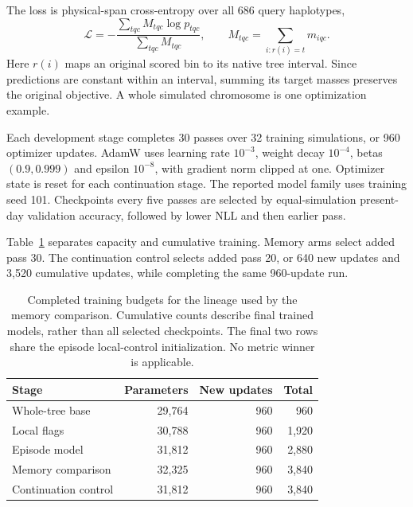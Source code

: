 \documentclass[letterpaper]{article}
\begin{document}
The loss is physical-span cross-entropy over all 686 query haplotypes,
\begin{equation}
\mathcal L=-\frac{\sum_{tqc} M_{tqc}\log p_{tqc}}
                  {\sum_{tqc} M_{tqc}},
\qquad
M_{tqc}=\sum_{i:r(i)=t}m_{iqc}.
\end{equation}
Here $r(i)$ maps an original scored bin to its native tree interval. Since predictions are constant within an interval, summing its target masses preserves the original objective. A whole simulated chromosome is one optimization example.

Each development stage completes 30 passes over 32 training simulations, or 960 optimizer updates. AdamW uses learning rate $10^{-3}$, weight decay $10^{-4}$, betas $(0.9,0.999)$ and epsilon $10^{-8}$, with gradient norm clipped at one. Optimizer state is reset for each continuation stage. The reported model family uses training seed 101. Checkpoints every five passes are selected by equal-simulation present-day validation accuracy, followed by lower NLL and then earlier pass.

Table~\ref{tab:budget} separates capacity and cumulative training. Memory arms select added pass 30. The continuation control selects added pass 20, or 640 new updates and 3,520 cumulative updates, while completing the same 960-update run.

\begin{table}[t]
\centering
\small
\begin{tabular}{@{}lrrr@{}}
\toprule
Stage & Parameters & New updates & Total\\
\midrule
Whole-tree base &29,764&960&960\\
Local flags &30,788&960&1,920\\
Episode model &31,812&960&2,880\\
Memory comparison &32,325&960&3,840\\
Continuation control &31,812&960&3,840\\
\bottomrule
\end{tabular}
\caption{Completed training budgets for the lineage used by the memory comparison. Cumulative counts describe final trained models, rather than all selected checkpoints. The final two rows share the episode local-control initialization. No metric winner is applicable.}
\label{tab:budget}
\end{table}
\end{document}
